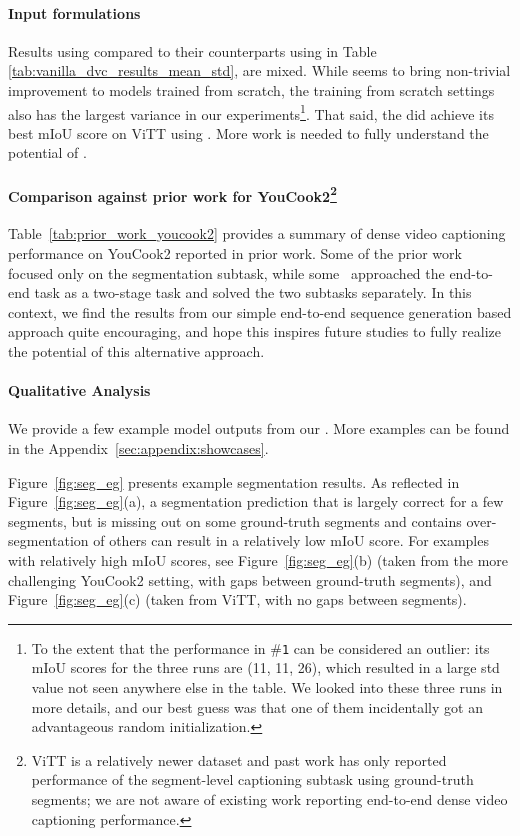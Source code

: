 \documentclass[11pt]{article}
\begin{document}
\paragraph{Input formulations} 
Results using \SimpleConcatShort compared to their counterparts using \TemporalEmbShort in Table \ref{tab:vanilla_dvc_results_mean_std}, are mixed.
While \TemporalEmbShort seems to bring non-trivial improvement to models trained from scratch, the training from scratch settings also has the largest variance in our experiments\footnote{To the extent that the \segcap performance in \#\texttt{1} can be considered an outlier: its mIoU scores for the three runs are (11, 11, 26), which resulted in a large std value not seen anywhere else in the table.  We looked into these three runs in more details, and our best guess was that one of them incidentally got an advantageous random initialization.}.
That said, the \segcap did achieve its best mIoU score on ViTT using \TemporalEmbShort.
More work is needed to fully understand the potential of \TemporalEmbShort.

\paragraph{Comparison against prior work for YouCook2\footnote{ViTT is a relatively newer dataset and past work has only reported performance of the segment-level captioning subtask using ground-truth segments; we are not aware of existing work reporting end-to-end dense video captioning performance.}}
Table~\ref{tab:prior_work_youcook2} provides a summary of dense video captioning performance on YouCook2 reported in prior work.
Some of the prior work~\citep{Zhang2016VideoSW,Shou2016TemporalAL,Zhou2018TowardsAL} focused only on the segmentation subtask, while some~\citep{Zhou2018EndtoEndDV,Shi2019DensePC} approached the end-to-end task as a two-stage task and solved the two subtasks separately.
In this context, we find the results from our simple end-to-end sequence generation based approach quite encouraging, and hope this inspires future studies to fully realize the potential of this alternative approach.


\paragraph{Qualitative Analysis} 
We provide a few example model outputs from our \segcap.
More examples can be found in the Appendix~\ref{sec:appendix:showcases}.

Figure~\ref{fig:seg_eg} presents example segmentation results.  
As reflected in Figure~\ref{fig:seg_eg}(a), a segmentation prediction that is largely correct for a few segments, but is missing out on some ground-truth segments and contains over-segmentation of others can result in a relatively low mIoU score. 
For examples with relatively high mIoU scores, see Figure~\ref{fig:seg_eg}(b) (taken from the more challenging YouCook2 setting, with gaps between ground-truth segments), and Figure~\ref{fig:seg_eg}(c) (taken from ViTT, with no gaps between segments).
\end{document}
